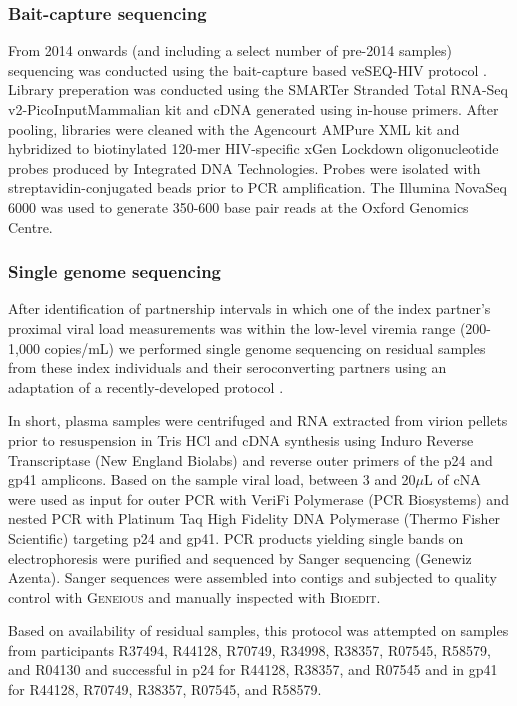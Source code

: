 \documentclass{article}[11pt]
\begin{document}
\subsubsection*{Bait-capture sequencing}
From 2014 onwards (and including a select number of pre-2014 samples) sequencing was conducted using the bait-capture based veSEQ-HIV protocol \cite{bonsall2020}. Library preperation was conducted using the SMARTer Stranded Total RNA-Seq v2-PicoInputMammalian kit and cDNA generated using in-house primers. After pooling, libraries were cleaned with the Agencourt AMPure XML kit and hybridized to biotinylated 120-mer HIV-specific xGen Lockdown oligonucleotide probes produced by Integrated DNA Technologies. Probes were isolated with streptavidin-conjugated beads prior to PCR amplification. The Illumina NovaSeq 6000 was used to generate 350-600 base pair reads at the Oxford Genomics Centre. 

\subsubsection*{Single genome sequencing}
After identification of partnership intervals in which one of the index partner's proximal viral load measurements was within the low-level viremia range (200-1,000 copies/mL) we performed single genome sequencing on residual samples from these index individuals and their seroconverting partners using an adaptation of a recently-developed protocol \cite{box2026}.

In short, plasma samples were centrifuged and RNA extracted from virion pellets prior to resuspension in Tris HCl and cDNA synthesis using Induro Reverse Transcriptase (New England Biolabs) and reverse outer primers of the p24 and gp41 amplicons. Based on the sample viral load, between 3 and 20$\mu$L of cNA were used as input for outer PCR with VeriFi Polymerase (PCR Biosystems) and nested PCR with Platinum Taq High Fidelity DNA Polymerase (Thermo Fisher Scientific) targeting p24 and gp41. PCR products yielding single bands on electrophoresis were purified and sequenced by Sanger sequencing (Genewiz Azenta). Sanger sequences were assembled into contigs and subjected to quality control with \textsc{Geneious} and manually inspected with \textsc{Bioedit}. 

Based on availability of residual samples, this protocol was attempted on samples from participants R37494, R44128, R70749, R34998, R38357, R07545, R58579, and R04130 and successful in p24 for R44128, R38357, and R07545 and in gp41 for R44128, R70749, R38357, R07545, and R58579. 
\end{document}
